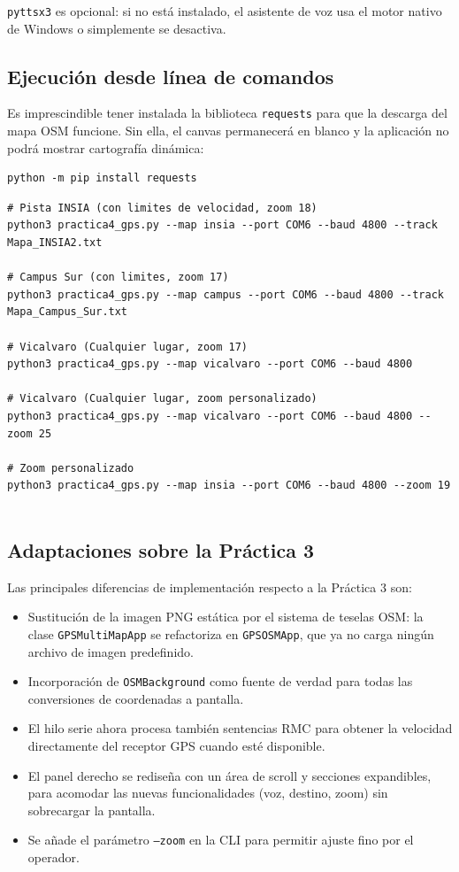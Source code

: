 \documentclass[10pt]{article}
\begin{document}
\texttt{pyttsx3} es opcional: si no está instalado, el asistente de voz usa el motor nativo de Windows o simplemente se desactiva.

\subsection{Ejecución desde línea de comandos}

Es imprescindible tener instalada la biblioteca \texttt{requests} para que la descarga del mapa OSM funcione. Sin ella, el canvas permanecerá en blanco y la aplicación no podrá mostrar cartografía dinámica:

\begin{lstlisting}[style=pythonEstilo]
python -m pip install requests
\end{lstlisting}

\begin{lstlisting}[style=pythonEstilo]
# Pista INSIA (con limites de velocidad, zoom 18)
python3 practica4_gps.py --map insia --port COM6 --baud 4800 --track Mapa_INSIA2.txt

# Campus Sur (con limites, zoom 17)
python3 practica4_gps.py --map campus --port COM6 --baud 4800 --track Mapa_Campus_Sur.txt

# Vicalvaro (Cualquier lugar, zoom 17)
python3 practica4_gps.py --map vicalvaro --port COM6 --baud 4800

# Vicalvaro (Cualquier lugar, zoom personalizado)
python3 practica4_gps.py --map vicalvaro --port COM6 --baud 4800 --zoom 25

# Zoom personalizado
python3 practica4_gps.py --map insia --port COM6 --baud 4800 --zoom 19


\end{lstlisting}


\subsection{Adaptaciones sobre la Práctica 3}

Las principales diferencias de implementación respecto a la Práctica 3 son:

\begin{itemize}[leftmargin=1.2em]
    \item Sustitución de la imagen PNG estática por el sistema de teselas OSM: la clase \texttt{GPSMultiMapApp} se refactoriza en \texttt{GPSOSMApp}, que ya no carga ningún archivo de imagen predefinido.
    \item Incorporación de \texttt{OSMBackground} como fuente de verdad para todas las conversiones de coordenadas a pantalla.
    \item El hilo serie ahora procesa también sentencias RMC para obtener la velocidad directamente del receptor GPS cuando esté disponible.
    \item El panel derecho se rediseña con un área de scroll y secciones expandibles, para acomodar las nuevas funcionalidades (voz, destino, zoom) sin sobrecargar la pantalla.
    \item Se añade el parámetro \texttt{--zoom} en la CLI para permitir ajuste fino por el operador.
\end{itemize}
\end{document}
